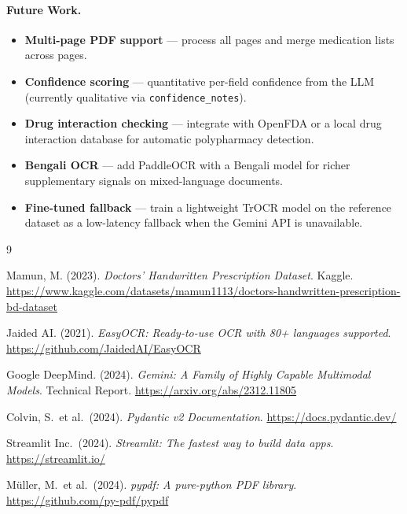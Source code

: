 \documentclass[12pt,a4paper]{article}
\begin{document}
\paragraph{Future Work.}
\begin{itemize}[noitemsep]
    \item \textbf{Multi-page PDF support} — process all pages and merge medication
          lists across pages.
    \item \textbf{Confidence scoring} — quantitative per-field confidence from the
          LLM (currently qualitative via \texttt{confidence\_notes}).
    \item \textbf{Drug interaction checking} — integrate with OpenFDA or a local
          drug interaction database for automatic polypharmacy detection.
    \item \textbf{Bengali OCR} — add PaddleOCR with a Bengali model for richer
          supplementary signals on mixed-language documents.
    \item \textbf{Fine-tuned fallback} — train a lightweight TrOCR model on the
          reference dataset as a low-latency fallback when the Gemini API is unavailable.
\end{itemize}

\begin{thebibliography}{9}

Mamun, M. (2023).
\textit{Doctors' Handwritten Prescription Dataset}.
Kaggle.
\url{https://www.kaggle.com/datasets/mamun1113/doctors-handwritten-prescription-bd-dataset}

Jaided AI. (2021).
\textit{EasyOCR: Ready-to-use OCR with 80+ languages supported}.
\url{https://github.com/JaidedAI/EasyOCR}

Google DeepMind. (2024).
\textit{Gemini: A Family of Highly Capable Multimodal Models}.
Technical Report.
\url{https://arxiv.org/abs/2312.11805}

Colvin, S.\ et al.\ (2024).
\textit{Pydantic v2 Documentation}.
\url{https://docs.pydantic.dev/}

Streamlit Inc.\ (2024).
\textit{Streamlit: The fastest way to build data apps}.
\url{https://streamlit.io/}

Müller, M.\ et al.\ (2024).
\textit{pypdf: A pure-python PDF library}.
\url{https://github.com/py-pdf/pypdf}

\end{thebibliography}
\end{document}
